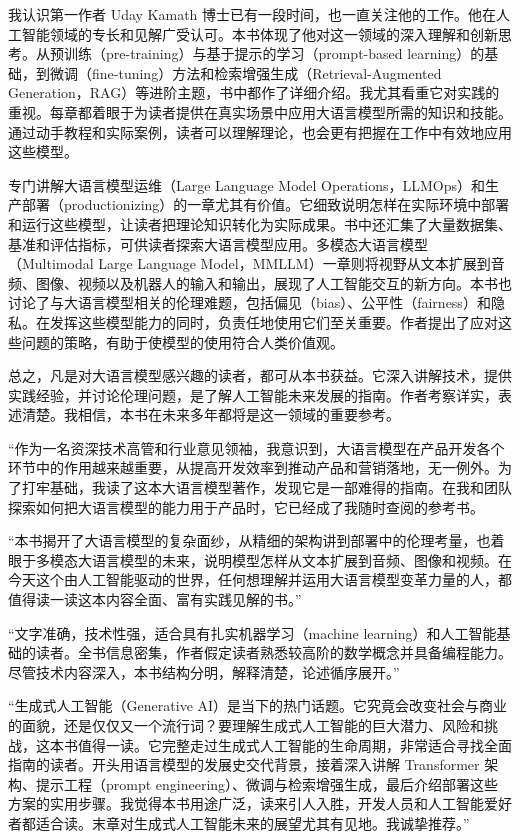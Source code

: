 我认识第一作者 Uday Kamath 博士已有一段时间，也一直关注他的工作。他在人工智能领域的专长和见解广受认可。本书体现了他对这一领域的深入理解和创新思考。从预训练（pre-training）与基于提示的学习（prompt-based learning）的基础，到微调（fine-tuning）方法和检索增强生成（Retrieval-Augmented Generation，RAG）等进阶主题，书中都作了详细介绍。我尤其看重它对实践的重视。每章都着眼于为读者提供在真实场景中应用大语言模型所需的知识和技能。通过动手教程和实际案例，读者可以理解理论，也会更有把握在工作中有效地应用这些模型。

专门讲解大语言模型运维（Large Language Model Operations，LLMOps）和生产部署（productionizing）的一章尤其有价值。它细致说明怎样在实际环境中部署和运行这些模型，让读者把理论知识转化为实际成果。书中还汇集了大量数据集、基准和评估指标，可供读者探索大语言模型应用。多模态大语言模型（Multimodal Large Language Model，MMLLM）一章则将视野从文本扩展到音频、图像、视频以及机器人的输入和输出，展现了人工智能交互的新方向。本书也讨论了与大语言模型相关的伦理难题，包括偏见（bias）、公平性（fairness）和隐私。在发挥这些模型能力的同时，负责任地使用它们至关重要。作者提出了应对这些问题的策略，有助于使模型的使用符合人类价值观。

总之，凡是对大语言模型感兴趣的读者，都可从本书获益。它深入讲解技术，提供实践经验，并讨论伦理问题，是了解人工智能未来发展的指南。作者考察详实，表述清楚。我相信，本书在未来多年都将是这一领域的重要参考。

“作为一名资深技术高管和行业意见领袖，我意识到，大语言模型在产品开发各个环节中的作用越来越重要，从提高开发效率到推动产品和营销落地，无一例外。为了打牢基础，我读了这本大语言模型著作，发现它是一部难得的指南。在我和团队探索如何把大语言模型的能力用于产品时，它已经成了我随时查阅的参考书。

“本书揭开了大语言模型的复杂面纱，从精细的架构讲到部署中的伦理考量，也着眼于多模态大语言模型的未来，说明模型怎样从文本扩展到音频、图像和视频。在今天这个由人工智能驱动的世界，任何想理解并运用大语言模型变革力量的人，都值得读一读这本内容全面、富有实践见解的书。”

“文字准确，技术性强，适合具有扎实机器学习（machine learning）和人工智能基础的读者。全书信息密集，作者假定读者熟悉较高阶的数学概念并具备编程能力。尽管技术内容深入，本书结构分明，解释清楚，论述循序展开。”

“生成式人工智能（Generative AI）是当下的热门话题。它究竟会改变社会与商业的面貌，还是仅仅又一个流行词？要理解生成式人工智能的巨大潜力、风险和挑战，这本书值得一读。它完整走过生成式人工智能的生命周期，非常适合寻找全面指南的读者。开头用语言模型的发展史交代背景，接着深入讲解 Transformer 架构、提示工程（prompt engineering）、微调与检索增强生成，最后介绍部署这些方案的实用步骤。我觉得本书用途广泛，读来引人入胜，开发人员和人工智能爱好者都适合读。末章对生成式人工智能未来的展望尤其有见地。我诚挚推荐。”

